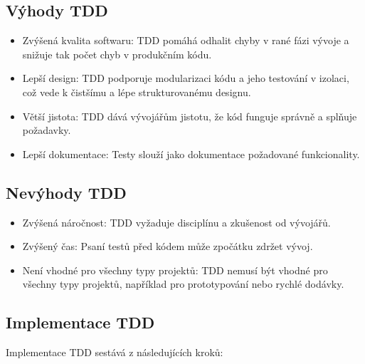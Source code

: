 \documentclass{article}
\begin{document}
\begin{Test Driven Development}
        \subsection{Výhody TDD}\label{subsec:vyhody-tdd}

        \begin{itemize}
            \item Zvýšená kvalita softwaru: TDD pomáhá odhalit chyby v rané fázi vývoje a snižuje tak počet chyb v produkčním kódu.
            \item Lepší design: TDD podporuje modularizaci kódu a jeho testování v izolaci, což vede k čistšímu a lépe strukturovanému designu.
            \item Větší jistota: TDD dává vývojářům jistotu, že kód funguje správně a splňuje požadavky.
            \item Lepší dokumentace: Testy slouží jako dokumentace požadované funkcionality.
        \end{itemize}

        \subsection{Nevýhody TDD}\label{subsec:nevyhody-tdd}

        \begin{itemize}
            \item Zvýšená náročnost: TDD vyžaduje disciplínu a zkušenost od vývojářů.
            \item Zvýšený čas: Psaní testů před kódem může zpočátku zdržet vývoj.
            \item Není vhodné pro všechny typy projektů: TDD nemusí být vhodné pro všechny typy projektů, například pro prototypování nebo rychlé dodávky.
        \end{itemize}

        \subsection{Implementace TDD}\label{subsec:implementace-tdd}

        Implementace TDD sestává z následujících kroků:


\end{Test Driven Development}
\end{document}
